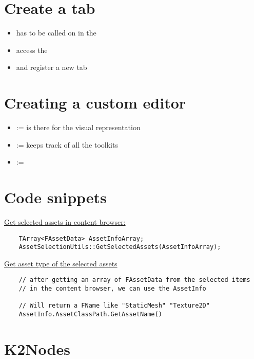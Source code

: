     \section{Create a tab}
        \begin{itemize}
            \item has to be called on in the 
            \item access the 
            \item and register a new tab 
        \end{itemize}



    \section{Creating a custom editor}
        \begin{itemize}
            \item {} := is there for the visual representation
            \item {} := keeps track of all the toolkits
            \item {} :=
        \end{itemize}

    \section{Code snippets}
        \uline{Get selected assets in content browser:}
        \begin{lstlisting}
    TArray<FAssetData> AssetInfoArray;
    AssetSelectionUtils::GetSelectedAssets(AssetInfoArray);
        \end{lstlisting}

        \uline{Get asset type of the selected assets}
        \begin{lstlisting}
    // after getting an array of FAssetData from the selected items
    // in the content browser, we can use the AssetInfo
    
    // Will return a FName like "StaticMesh" "Texture2D"
    AssetInfo.AssetClassPath.GetAssetName()
        \end{lstlisting}
    
    \section{K2Nodes}

